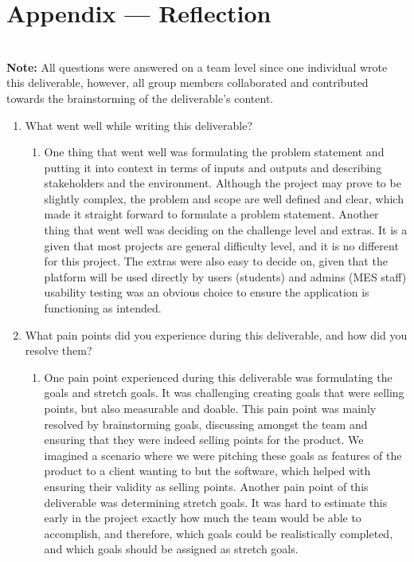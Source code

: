 \documentclass{article}
\begin{document}
\newpage{}

\section*{Appendix --- Reflection}


\\

\textbf{Note:} All questions were answered on a team level since one individual wrote this deliverable, however, all group members collaborated and contributed towards the brainstorming of the deliverable's content.

\begin{enumerate}
    \item What went well while writing this deliverable? 
    \begin{enumerate}
        \item One thing that went well was formulating the problem statement and putting it into context in terms of inputs and outputs and describing stakeholders and the environment. Although the project may prove to be slightly complex, the problem and scope are well defined and clear, which made it straight forward to formulate a problem statement. Another thing that went well was deciding on the challenge level and extras. It is a given that most projects are general difficulty level, and it is no different for this project. The extras were also easy to decide on, given that the platform will be used directly by users (students) and admins (MES staff) usability testing was an obvious choice to ensure the application is functioning as intended.
    \end{enumerate}
    \item What pain points did you experience during this deliverable, and how
    did you resolve them?
    \begin{enumerate}
        \item One pain point experienced during this deliverable was formulating the goals and stretch goals. It was challenging creating goals that were selling points, but also measurable and doable. This pain point was mainly resolved by brainstorming goals, discussing amongst the team and ensuring that they were indeed selling points for the product. We imagined a scenario where we were pitching these goals as features of the product to a client wanting to but the software, which helped with ensuring their validity as selling points. Another pain point of this deliverable was determining stretch goals. It was hard to estimate this early in the project exactly how much the team would be able to accomplish, and therefore, which goals could be realistically completed, and which goals should be assigned as stretch goals.

\end{enumerate}
\end{enumerate}
\end{document}
